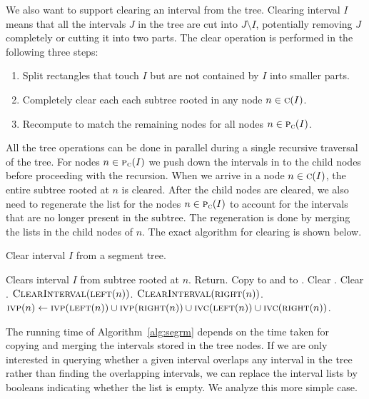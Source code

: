 \documentclass[english,gradu]{tktltiki2018}
\begin{document}
We also want to support clearing an interval from the tree.
Clearing interval $I$ means that all the intervals $J$ in the tree are cut into $J\setminus I$, potentially removing $J$ completely or cutting it into two parts.
The clear operation is performed in the following three steps:
\begin{enumerate}
\item Split rectangles that touch $I$ but are not contained by $I$ into smaller parts.
\item Completely clear each each subtree rooted in any node $n\in\textsc{c}(I)$.
\item Recompute  to match the remaining nodes for all nodes $n\in\textsc{p}_{\textsc{c}}(I)$.
\end{enumerate}

All the tree operations can be done in parallel during a single recursive traversal of the tree.
For nodes $n\in\textsc{p}_{\textsc{c}}(I)$ we push down the intervals in  to the child nodes before proceeding with the recursion.
When we arrive in a node $n\in\textsc{c}(I)$, the entire subtree rooted at $n$ is cleared.
After the child nodes are cleared, we also need to regenerate the  list for the nodes $n\in\textsc{p}_{\textsc{c}}(I)$ to account for the intervals that are no longer present in the subtree.
The regeneration is done by merging the lists in the child nodes of $n$.
The exact algorithm for clearing is shown below.

\begin{alg}\label{alg:segrm}
Clear interval $I$ from a segment tree.
\begin{algorithmic}
	\Comment Clears interval $I$ from subtree rooted at $n$.
		Return.
	\EndIf
		\State Copy  to  and to .
	\EndIf
	\State Clear .
	\State Clear .
		\State $\textsc{ClearInterval}(\textsc{left}(n))$.
		\State $\textsc{ClearInterval}(\textsc{right}(n))$.
	\EndIf
		\State $\textsc{ivp}(n)\gets \textsc{ivp}(\textsc{left}(n)) \cup \textsc{ivp}(\textsc{right}(n)) \cup \textsc{ivc}(\textsc{left}(n)) \cup \textsc{ivc}(\textsc{right}(n))$.
	\EndIf
\EndProcedure
\end{algorithmic}
\end{alg}

The running time of Algorithm~\ref{alg:segrm} depends on the time taken for copying and merging the intervals stored in the tree nodes.
If we are only interested in querying whether a given interval overlaps any interval in the tree rather than finding the overlapping intervals, we can replace the interval lists by booleans indicating whether the list is empty.
We analyze this more simple case.
\end{document}
